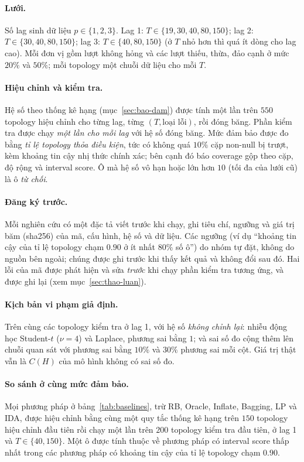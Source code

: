 \paragraph{Lưới.} Số lag sinh dữ liệu $p\in\{1,2,3\}$. Lag 1: $T\in\{19,30,40,80,150\}$; lag 2: $T\in\{30,40,80,150\}$; lag 3: $T\in\{40,80,150\}$ (ở $T$ nhỏ hơn thì quá ít dòng cho lag cao). Mỗi đơn vị gồm lượt không hỏng và các lượt thiếu, thừa, đảo cạnh ở mức $20\%$ và $50\%$; mỗi topology một chuỗi dữ liệu cho mỗi $T$.

\paragraph{Hiệu chỉnh và kiểm tra.} Hệ số theo thống kê hạng (mục~\ref{sec:bao-dam}) được tính một lần trên $550$ topology hiệu chỉnh cho từng lag, từng $(T,\text{loại lỗi})$, rồi đóng băng. Phần kiểm tra được chạy \emph{một lần cho mỗi lag} với hệ số đóng băng. Mức đảm bảo được đo bằng \emph{tỉ lệ topology thỏa điều kiện}, tức có không quá $10\%$ cặp non-null bị trượt, kèm khoảng tin cậy nhị thức chính xác; bên cạnh đó báo coverage gộp theo cặp, độ rộng và interval score. Ô mà hệ số vô hạn hoặc lớn hơn $10$ (tối đa của lưới cũ) là ô \emph{từ chối}.

\paragraph{Đăng ký trước.} Mỗi nghiên cứu có một đặc tả viết trước khi chạy, ghi tiêu chí, ngưỡng và giá trị băm (sha256) của mã, cấu hình, hệ số và dữ liệu. Các ngưỡng (ví dụ ``khoảng tin cậy của tỉ lệ topology chạm $0.90$ ở ít nhất $80\%$ số ô'') do nhóm tự đặt, không do nguồn bên ngoài; chúng được ghi trước khi thấy kết quả và không đổi sau đó. Hai lỗi của mã được phát hiện và sửa \emph{trước} khi chạy phần kiểm tra tương ứng, và được ghi lại (xem mục~\ref{sec:thao-luan}).

\paragraph{Kịch bản vi phạm giả định.} Trên cùng các topology kiểm tra ở lag 1, với hệ số \emph{không chỉnh lại}: nhiễu động học Student-$t$ ($\nu=4$) và Laplace, phương sai bằng $1$; và sai số đo cộng thêm lên chuỗi quan sát với phương sai bằng $10\%$ và $30\%$ phương sai mỗi cột. Giá trị thật vẫn là $C(H)$ của mô hình không có sai số đo.

\paragraph{So sánh ở cùng mức đảm bảo.} Mọi phương pháp ở bảng~\ref{tab:baselines}, trừ RB, Oracle, Inflate, Bagging, LP và IDA, được hiệu chỉnh bằng cùng một quy tắc thống kê hạng trên $150$ topology hiệu chỉnh đầu tiên rồi chạy một lần trên $200$ topology kiểm tra đầu tiên, ở lag 1 và $T\in\{40,150\}$. Một ô được tính thuộc về phương pháp có interval score thấp nhất trong các phương pháp có khoảng tin cậy của tỉ lệ topology chạm $0.90$.

